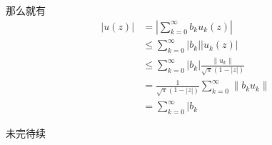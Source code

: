 \begin{exercise}
\begin{enumerate}
那么就有
\begin{align*}
|u(z)|&=|\sum_{k=0}^{\infty}b_ku_k(z)|\\
&\leq\sum_{k=0}^{\infty}|b_k||u_k(z)|\\
&\leq\sum_{k=0}^{\infty}|b_k|\frac{\|u_k\|}{\sqrt{\pi}(1-|z|)}\\
&=\frac{1}{\sqrt{\pi}(1-|z|)}\sum_{k=0}^{\infty}\|b_ku_k\|\\
&=\sum_{k=0}^{\infty}|b_k
\end{align*}


未完待续
\end{enumerate}
\end{exercise}

\begin{exercise}
\hfill\\



\end{exercise}



